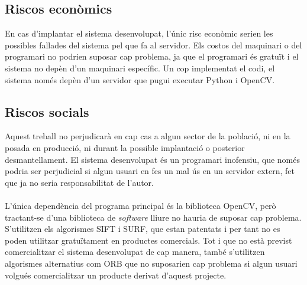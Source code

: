 	\subsection{Riscos econòmics}
		En cas d'implantar el sistema desenvolupat, l'únic risc econòmic serien les possibles fallades del sistema pel que fa al servidor. Els costos del maquinari o del programari no podrien suposar cap
		problema, ja que el programari és gratuït i el sistema no depèn d'un maquinari específic. Un cop implementat el codi, el sistema només depèn d'un servidor que pugui executar Python i OpenCV.

	\subsection{Riscos socials}
		Aquest treball no perjudicarà en cap cas a algun sector de la població, ni en la posada en producció, ni durant la possible implantació o posterior desmantellament. El sistema desenvolupat és un 
		programari inofensiu, que només podria ser perjudicial si algun usuari en fes un mal ús en un servidor extern, fet que ja no seria responsabilitat de l'autor.\\\\
		L'única dependència del programa principal és la biblioteca OpenCV, però tractant-se d'una biblioteca de \textit{software} lliure no hauria de suposar cap problema. S'utilitzen els algorismes
		SIFT i SURF, que estan patentats i per tant no es poden utilitzar gratuïtament en productes comercials. Tot i que no està previst comercialitzar el sistema desenvolupat de cap manera, també s'utilitzen
		algorismes alternatius com ORB que no suposarien cap problema si algun usuari volgués comercialitzar un producte derivat d'aquest projecte.

